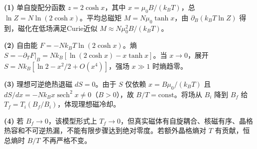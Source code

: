 \par\noindent\textbf{(1)} 单自旋配分函数 \(z=2\cosh x\)，其中 \(x=\mu_0B/(k_BT)\)，总 \(\ln Z=N\ln(2\cosh x)\)。平均总磁矩 \(M=N\mu_0\tanh x\)，由 \(\partial_B(k_BT\ln Z)\) 得到，磁化在低场满足Curie近似 \(M\approx N\mu_0^2B/(k_BT)\)。
\par\noindent\textbf{(2)} 自由能 \(F=-Nk_BT\ln(2\cosh x)\)。熵 \(S=-\partial_TF|_B=Nk_B[\ln(2\cosh x)-x\tanh x]\)。当 \(x\to0\)，展开 \(S=Nk_B[\ln2-x^2/2+O(x^4)]\)，强场 \(x\gg1\) 时熵趋零。
\par\noindent\textbf{(3)} 理想可逆绝热退磁 \(dS=0\)。由于 \(S\) 仅依赖 \(x=B\mu_0/(k_BT)\) 且 \(dS/dx=-Nk_Bx\operatorname{sech}^2x\neq0\)（\(B>0\)），故 \(B/T=\mathrm{const}\)。将场从 \(B_i\) 降到 \(B_f\) 给 \(T_f=T_i(B_f/B_i)\)，体现理想磁冷却。
\par\noindent\textbf{(4)} 若 \(B_f\to0\)，该模型形式上 \(T_f\to0\)，但真实磁体有自旋耦合、核磁有序、晶格热容和不可逆热漏，不能有限步骤达到绝对零度。若额外晶格熵对 \(T\) 有贡献，恒总熵时 \(B/T\) 不再严格不变。
